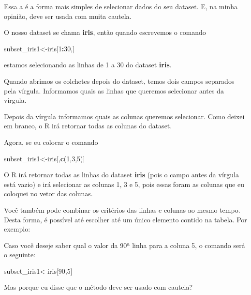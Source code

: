 \documentclass[
]{book}
\newenvironment{Shaded}{\begin{snugshade}}{\end{snugshade}}
\newcommand{\DecValTok}[1]{\textcolor[rgb]{0.00,0.00,0.81}{#1}}
\newcommand{\KeywordTok}[1]{\textcolor[rgb]{0.13,0.29,0.53}{\textbf{#1}}}
\newcommand{\NormalTok}[1]{#1}
\newcommand{\OperatorTok}[1]{\textcolor[rgb]{0.81,0.36,0.00}{\textbf{#1}}}
\begin{document}
Essa a é a forma mais simples de selecionar dados do seu dataset. E, na
minha opinião, deve ser usada com muita cautela.

O nosso dataset se chama \textbf{iris}, então quando escrevemos o
comando

\begin{Shaded}
\begin{Highlighting}[]
\NormalTok{subset_iris1<-iris[}\DecValTok{1}\OperatorTok{:}\DecValTok{30}\NormalTok{,]}
\end{Highlighting}
\end{Shaded}

estamos selecionando as linhas de 1 a 30 do dataset \textbf{iris}.

Quando abrimos os colchetes depois do dataset, temos dois campos
separados pela vírgula. Informamos quais as linhas que queremos
selecionar antes da vírgula.

Depois da vírgula informamos quais as colunas queremos selecionar. Como
deixei em branco, o R irá retornar todas as colunas do dataset.

Agora, se eu colocar o comando

\begin{Shaded}
\begin{Highlighting}[]
\NormalTok{subset_iris1<-iris[,}\KeywordTok{c}\NormalTok{(}\DecValTok{1}\NormalTok{,}\DecValTok{3}\NormalTok{,}\DecValTok{5}\NormalTok{)]}
\end{Highlighting}
\end{Shaded}

O R irá retornar todas as linhas do dataset \textbf{iris} (pois o campo
antes da vírgula está vazio) e irá selecionar as colunas 1, 3 e 5, pois
essas foram as colunas que eu coloquei no vetor das colunas.

Você também pode combinar os critérios das linhas e colunas ao mesmo
tempo. Desta forma, é possível até escolher até um único elemento
contido na tabela. Por exemplo:

Caso você deseje saber qual o valor da 90ª linha para a coluna 5, o
comando será o seguinte:

\begin{Shaded}
\begin{Highlighting}[]
\NormalTok{subset_iris1<-iris[}\DecValTok{90}\NormalTok{,}\DecValTok{5}\NormalTok{]}
\end{Highlighting}
\end{Shaded}

Mas porque eu disse que o método deve ser usado com cautela?
\end{document}
